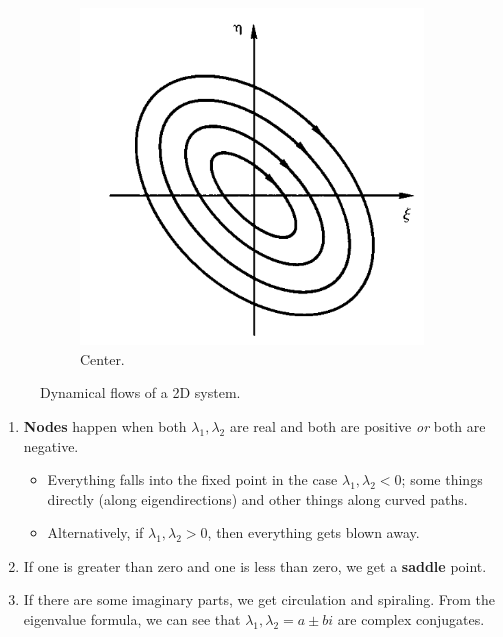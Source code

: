 \documentclass[../notes.tex]{subfiles}
\begin{document}
\begin{itemize}
\begin{figure}[h!]
        \begin{subfigure}[b]{0.24\linewidth}
            \centering
            \includegraphics[width=0.95\linewidth]{../ExtFiles/flows2Dd.png}
            \caption{Center.}
            \label{fig:flows2Dd}
        \end{subfigure}
        \caption{Dynamical flows of a 2D system.}
        \label{fig:flows2D}
    \end{figure}
    \begin{enumerate}
        \item \textbf{Nodes} happen when both $\lambda_1,\lambda_2$ are real and both are positive \emph{or} both are negative.
        \begin{itemize}
            \item Everything falls into the fixed point in the case $\lambda_1,\lambda_2<0$; some things directly (along eigendirections) and other things along curved paths.
            \item Alternatively, if $\lambda_1,\lambda_2>0$, then everything gets blown away.
        \end{itemize}
        \item If one is greater than zero and one is less than zero, we get a \textbf{saddle} point.
        \item If there are some imaginary parts, we get circulation and spiraling. From the eigenvalue formula, we can see that $\lambda_1,\lambda_2=a\pm bi$ are complex conjugates.

\end{enumerate}
\end{itemize}
\end{document}
